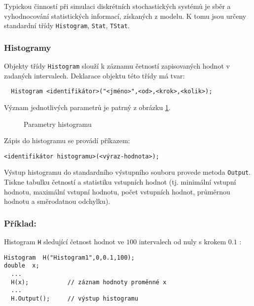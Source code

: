 \documentclass[a4paper]{article}
\begin{document}
Typickou činností při simulaci diskrétních stochastických
systémů je sběr a vyhodnocování statistických informací,
získaných z modelu. K tomu jsou určeny standardní třídy
\verb|Histogram|, \verb|Stat|, \verb|TStat|.


\subsubsection{Histogramy}

Objekty třídy \verb|Histogram| slouží k záznamu četností zapisovaných
hodnot v zadaných intervalech. Deklarace objektu této třídy
má tvar:

\begin{verbatim}
  Histogram <identifikátor>("<jméno>",<od>,<krok>,<kolik>);
\end{verbatim}

Význam jednotlivých parametrů je patrný z obrázku \ref{o4}.

\begin{figure}[ht]
  \begin{center}
    \caption{Parametry histogramu}
    \label{o4}
  \end{center}
\end{figure}

\noindent
Zápis do histogramu se provádí příkazem:

\begin{verbatim}
<identifikátor histogramu>(<výraz-hodnota>);
\end{verbatim}

Výstup histogramu do standardního výstupního souboru provede
metoda \verb|Output|. Tiskne tabulku četností a statistiku vstupních
hodnot (tj. minimální vstupní hodnotu, maximální vstupní
hodnotu, počet vstupních hodnot, průměrnou hodnotu a směrodatnou
odchylku).

\subsubsection*{Příklad:}

Histogram \verb|H| sledující četnost hodnot ve $100$ intervalech od nuly
s krokem $0.1$ :

\begin{verbatim}
Histogram  H("Histogram1",0,0.1,100);
double  x;
  ...
  H(x);           // záznam hodnoty proměnné x
  ...
  H.Output();     // výstup histogramu

\end{verbatim}
\end{document}
